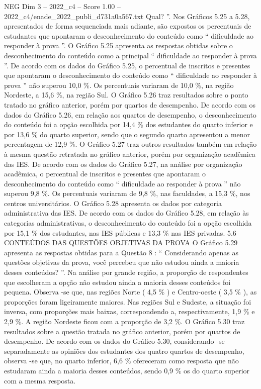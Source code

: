 \begin{textsample}{NEG Dim 3 – 2022\_c4 – Score 1.00 – 2022\_c4/enade\_2022\_publi\_d731a0a567.txt}
Qual? ”.
Nos Gráficos 5.25 a 5.28, apresentados de forma sequenciada mais adiante, são expostos os percentuais de estudantes que apontaram o desconhecimento do conteúdo como “ dificuldade ao responder à prova ”.
O Gráfico 5.25 apresenta as respostas obtidas sobre o desconhecimento do conteúdo como a principal “ dificuldade ao responder à prova ”.
De acordo com os dados do Gráfico 5.25, o percentual de inscritos e presentes que apontaram o desconhecimento do conteúdo como “ dificuldade ao responder à prova ” não superou 10,0 \%.
Os percentuais variaram de 10,0 \%, na região Nordeste, a 15,6 \%, na região Sul.
O Gráfico 5.26 traz resultados sobre o ponto tratado no gráfico anterior, porém por quartos de desempenho.
De acordo com os dados do Gráfico 5.26, em relação aos quartos de desempenho, o desconhecimento do conteúdo foi a opção escolhida por 14,4 \% dos estudantes do quarto inferior e por 13,6 \% do quarto superior, sendo que o segundo quarto apresentou a menor percentagem de 12,9 \%.
O Gráfico 5.27 traz outros resultados também em relação à mesma questão retratada no gráfico anterior, porém por organização acadêmica das IES.
De acordo com os dados do Gráfico 5.27, na análise por organização acadêmica, o percentual de inscritos e presentes que apontaram o desconhecimento do conteúdo como “ dificuldade ao responder à prova ” não superou 9,8 \%.
Os percentuais variaram de 9,8 \%, nas faculdades, a 15,3 \%, nos centros universitários.
O Gráfico 5.28 apresenta os dados por categoria administrativa das IES.
De acordo com os dados do Gráfico 5.28, em relação às categorias administrativas, o desconhecimento do conteúdo foi a opção escolhida por 15,1 \% dos estudantes, nas IES públicas e 13,3 \% nas IES privadas. 5.6 CONTEÚDOS DAS QUESTÕES OBJETIVAS DA PROVA O Gráfico 5.29 apresenta as respostas obtidas para a Questão 8 : “ Considerando apenas as questões objetivas da prova, você percebeu que não estudou ainda a maioria desses conteúdos? ”.
Na análise por grande região, a proporção de respondentes que escolheram a opção não estudou ainda a maioria desses conteúdos foi pequena.
Observa -se que, nas regiões Norte ( 4,5 \% ) e Centro-oeste ( 3,5 \% ), as proporções foram ligeiramente maiores.
Nas regiões Sul e Sudeste, a situação foi inversa, com proporções mais baixas, correspondendo a, respectivamente, 1,9 \% e 2,9 \%.
A região Nordeste ficou com a proporção de 3,2 \%.
O Gráfico 5.30 traz resultados sobre a questão tratada no gráfico anterior, porém por quartos de desempenho.
De acordo com os dados do Gráfico 5.30, considerando -se separadamente as opiniões dos estudantes dos quatro quartos de desempenho, observa -se que, no quarto inferior, 6,6 \% ofereceram como resposta que não estudaram ainda a maioria desses conteúdos, sendo 0,9 \% os do quarto superior com a mesma resposta.

\end{textsample}
